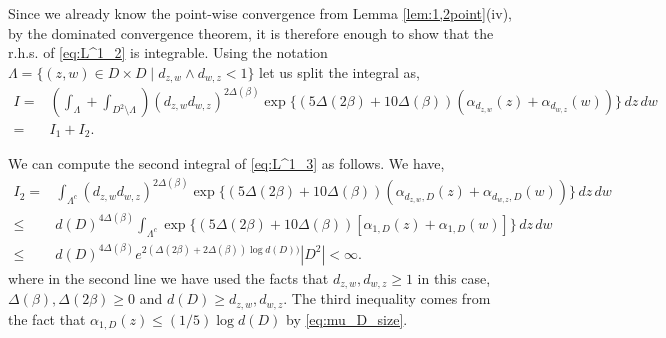 \documentclass[a4paper, 11pt, reqno]{amsart}
\theoremstyle{definition} \newtheorem{defn}{Definition}[section]
\theoremstyle{remark} \newtheorem{rem}[defn]{Remark}
\theoremstyle{remark} \newtheorem*{rem*}{Remark}
\theoremstyle{plain} \newtheorem{thm}[defn]{Theorem}
\theoremstyle{plain} \newtheorem{lem}[defn]{Lemma}
\theoremstyle{plain} \newtheorem{prop}[defn]{Proposition}
\theoremstyle{plain} \newtheorem{cor}[defn]{Corollary}
\theoremstyle{remark} \newtheorem{exm}[defn]{\textbf{Example}}
\theoremstyle{remark} \newtheorem{exms}[defn]{\textbf{Examples}}
\theoremstyle{remark} \newtheorem*{bl}{}
\numberwithin{equation}{section} %
\newcommand{\x}{\times}
\newcommand{\C}{\mathbb{C}}
\begin{document}
		Since we already know the point-wise convergence from Lemma \ref{lem:1,2point}(iv), by the dominated convergence theorem, it is therefore enough to show that the r.h.s. of \eqref{eq:L^1_2} is integrable. Using the notation $\Lambda = \{ (z,w) \in D\x D \mid d_{z,w}\wedge d_{w,z}<1\}$ let us split the integral as,
		\begin{align}\label{eq:L^1_3}
			I 
			= & \left(\int_{\Lambda}  + \int_{D^2 \setminus \Lambda} \right) (d_{z,w}d_{w,z})^{2 \Delta(\beta)} \exp\{ (5\Delta(2\beta) + 10\Delta(\beta)) (\alpha_{d_{z,w}}(z) + \alpha_{d_{w,z}}(w))\} \, dz \, dw 
			\nonumber \\
			= & I_1+ I_2.
		\end{align}
		
		We can compute the second integral of \eqref{eq:L^1_3} as follows. We have,
		\begin{align}\label{eq:L^1_5}
			I_2 = & \int_{\Lambda^c}  (d_{z,w}d_{w,z})^{2 \Delta(\beta)}  \exp\{ (5\Delta(2\beta) + 10\Delta(\beta)) (\alpha_{d_{z,w}, D}(z) + \alpha_{d_{w,z}, D}(w))\} \, dz \, dw 
			\nonumber \\
			\le & d(D)^{4\Delta(\beta)} \int_{\Lambda^c}  \exp\{ (5\Delta(2\beta) + 10\Delta(\beta)) [\alpha_{1, D}(z) + \alpha_{1, D} (w)]\}  \, dz \, dw 
			\nonumber \\
			\le & d(D)^{4\Delta(\beta)} e^ {2(\Delta(2\beta) + 2\Delta(\beta)) \log d(D))} |D^2| 
            < \infty.
		\end{align}
		where in the second line we have used the facts that $d_{z,w}, d_{w,z} \ge 1$ in this case, $\Delta(\beta), \Delta(2\beta)\ge 0$ and $d(D) \ge d_{z, w}, d_{w, z}$. The third inequality comes from the fact that $\alpha_{1, D}(z) \le (1/5) \log d(D)$ by \eqref{eq:mu_D_size}. 
		
\end{document}
